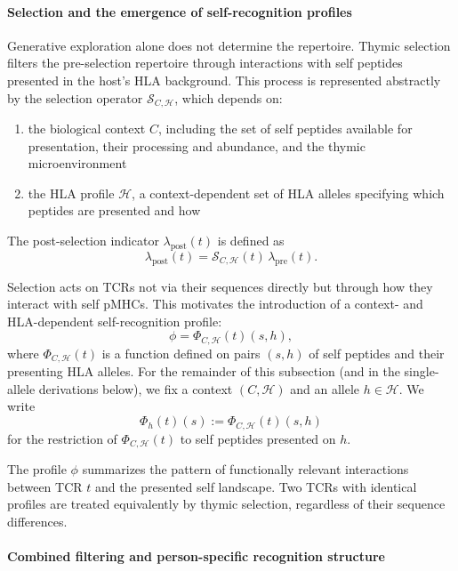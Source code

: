 \documentclass[11pt]{article}
\begin{document}
\paragraph{Selection and the emergence of self-recognition profiles}

Generative exploration alone does not determine the repertoire. Thymic selection filters the pre-selection repertoire through interactions with self peptides presented in the host’s HLA background. This process is represented abstractly by the selection operator \(\mathcal{S}_{C,\mathcal{H}}\), which depends on:
\begin{enumerate}
    \item the biological context \(C\), including the set of self peptides available for presentation, their processing and abundance, and the thymic microenvironment
    \item the HLA profile \(\mathcal{H}\), a context-dependent set of HLA alleles specifying which peptides are presented and how
\end{enumerate}  


The post-selection indicator \(\lambda_{\mathrm{post}}(t)\) is defined as
\[
    \lambda_{\mathrm{post}}(t)
    =
    \mathcal{S}_{C,\mathcal{H}}(t)\,\lambda_{\mathrm{pre}}(t).
\]


Selection acts on TCRs not via their sequences directly but through how they interact with self pMHCs. This motivates the introduction of a context- and HLA-dependent self-recognition profile:
\[
    \phi = \Phi_{C,\mathcal{H}}(t)(s,h),
\]
where \(\Phi_{C,\mathcal{H}}(t)\) is a function defined on pairs \((s,h)\) of self peptides and their presenting HLA alleles. For the remainder of this subsection (and in the single-allele derivations below), we fix a context $(C,\mathcal{H})$ and an allele $h \in \mathcal{H}$. We write
\[
\Phi_h(t)(s) := \Phi_{C,\mathcal{H}}(t)(s,h)
\]
for the restriction of $\Phi_{C,\mathcal{H}}(t)$ to self peptides presented on $h$.

The profile \(\phi\) summarizes the pattern of functionally relevant interactions between TCR \(t\) and the presented self landscape. Two TCRs with identical profiles are treated equivalently by thymic selection, regardless of their sequence differences.


\paragraph{Combined filtering and person-specific recognition structure}
\end{document}
